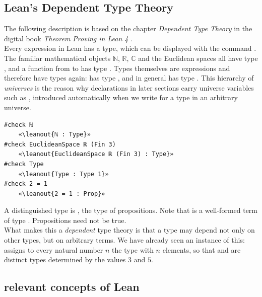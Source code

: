 \documentclass[11pt, a4paper, english]{article}
\newcommand{\leanout}[1]{{\normalfont\ttfamily\color{leanOutput} #1}}
\theoremstyle{plain}
\theoremstyle{definition}
\theoremstyle{remark}
\numberwithin{equation}{section}
\numberwithin{theorem}{section}
\begin{document}
\subsection{Lean's Dependent Type Theory} \label{subsec:typetheory}
The following description is based on the chapter \emph{Dependent Type Theory} in the digital book \emph{Theorem Proving in Lean 4}  \cite{TPIL}. \\ 
Every expression in Lean has a type, which can be displayed with the command . The familiar mathematical objects $\mathbb{N}$, $\mathbb{R}$, $\mathbb{C}$ and the Euclidean spaces all have type , and a function from  to  has type . Types themselves are expressions and therefore have types again:  has type , and in general  has type . This hierarchy of \emph{universes} is the reason why declarations in later sections carry universe variables such as , introduced automatically when we write  for a type in an arbitrary universe.

\begin{verbatim}
#check ℕ
    «\leanout{ℕ : Type}»
#check EuclideanSpace ℝ (Fin 3)
    «\leanout{EuclideanSpace ℝ (Fin 3) : Type}»
#check Type
    «\leanout{Type : Type 1}»
#check 2 = 1
    «\leanout{2 = 1 : Prop}»
\end{verbatim}

A distinguished type is , the type of propositions. Note that  is a well-formed term of type . Propositions need not be true. \\

What makes this a \emph{dependent} type theory is that a type may depend not only on other types, but on arbitrary terms. We have already seen an instance of this:  assigns to every natural number $n$ the type with $n$ elements, so that  and  are distinct types determined by the values $3$ and $5$.

\subsection{relevant concepts of Lean} \label{subsec:concepts}
\end{document}
